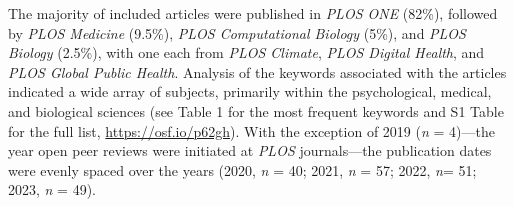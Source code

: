 \documentclass[authordate, meta, issue]{jote-new-article}
\begin{document}
	

	The majority of included articles were published in \emph{PLOS ONE} (82\%), followed by \emph{PLOS Medicine} (9.5\%), \emph{PLOS Computational Biology} (5\%), and \emph{PLOS Biology} (2.5\%), with one each from \emph{PLOS Climate}, \emph{PLOS Digital Health}, and \emph{PLOS Global Public Health}. Analysis of the keywords associated with the articles indicated a wide array of subjects, primarily within the psychological, medical, and biological sciences (see Table 1 for the most frequent keywords and S1 Table for the full list, \url{https://osf.io/p62gh}). With the exception of 2019 (\emph{n} = 4)—the year open peer reviews were initiated at \emph{PLOS} journals—the publication dates were evenly spaced over the years (2020, \emph{n} = 40; 2021, \emph{n} = 57; 2022, \emph{n}= 51; 2023, \emph{n} = 49).
\end{document}
